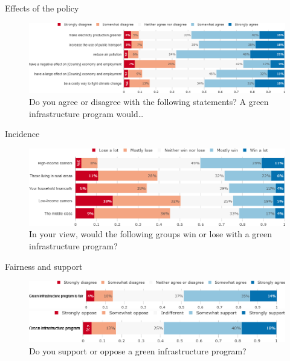 \begin{framefont}{\small}
\begin{frame}{Effects of the policy}%


\begin{figure}[h!]
\centering
\caption{Do you agree or disagree with the following statements? A green infrastructure program would…}
\includegraphics[width=.87\paperwidth]{../figures/FR/investments_effect_FR.png}
\end{figure}
\end{frame}

\begin{frame}{Incidence}%
\begin{figure}[h!]
\centering
\caption{In your view, would the following groups win or lose with a green infrastructure program?}
\includegraphics[width=.87\paperwidth]{../figures/FR/investments_win_lose_FR.png}
\end{figure}
\end{frame}

\begin{frame}{Fairness and support}%
\begin{figure}[h!]
\centering
\caption{Do you agree or disagree with the following statement: ``A green infrastructure program mainly financed by public debt is fair."}
\includegraphics[width=.87\paperwidth]{../figures/FR/investments_fair_FR.png}
\vspace{.5cm}
\centering
\caption{Do you support or oppose a green infrastructure program?}
\includegraphics[width=.87\paperwidth]{../figures/FR/investments_support_FR.png}
\end{figure}



\end{frame}
\end{framefont}
